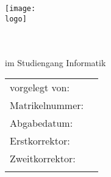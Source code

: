 \thispagestyle{plain}
\begin{titlepage}

	\begin{center}

		\texttt{[image: \\logo]} \vspace{15ex}


		\huge{\titel}\\ \vspace{10ex}
		\LARGE{\textbf{\art}}\\ \vspace{1.5ex}
		\large{im Studiengang Informatik} \\ \vspace{10ex}

		\normalsize
		\begin{tabular}{w{5.4cm}p{6cm}} \\ \vspace{1.2ex}
			vorgelegt von:  & \quad \autor          \\ \vspace{1.2ex}
			Matrikelnummer: & \quad \matrikelnr     \\ \vspace{1.2ex}
			Abgabedatum:    & \quad \abgabe         \\ \vspace{1.2ex}
			Erstkorrektor:  & \quad \erstkorrektor  \\ \vspace{1.2ex}
			Zweitkorrektor: & \quad \zweitkorrektor \\ \vspace{1.2ex}
		\end{tabular}

	\end{center}


\end{titlepage}
